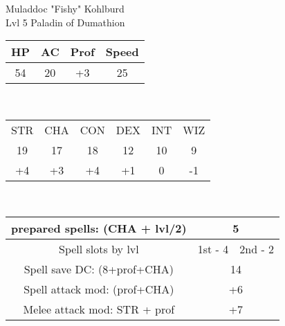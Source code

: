 \documentclass[12pt, xcolor={dvipsnames}]{beamer}
\newcommand{\str}{{\color{red}STR}}
\newcommand{\con}{{\color{red}CON}}
\newcommand{\wiz}{{\color{red}WIZ}}
\newcommand{\dex}{{\color{red}DEX}}
\newcommand{\inte}{{\color{red}INT}}
\newcommand{\cha}{{\color{red}CHA}}
\begin{document}
\begin{frame}
  \large
  \centering
  {\color{blue}Muladdoc "Fishy" Kohlburd}\\
  \normalsize{{\color{Cerulean} Lvl 5} \color{OliveGreen}Paladin of Dumathion}\\
  \vspace{1em}
  \small
  \centering
  \begin{tabular}{|c|c|c|c|}
    \textbf{HP} & \textbf{AC} & Prof & Speed\\ \hline
    54 & 20 & +3 & 25\\
  \end{tabular}\\
\vspace{1em}
  \begin{tabular}{|c|c|c|c|c|c|}
    {\str} & {\cha} & {\con} & {\dex} & {\inte} & {\wiz}\\
    19 & 17 & 18 & 12 & 10 & 9\\\hline
    +4 & +3 & +4 & +1 & 0 & -1\\
  \end{tabular}\\
  \vspace{1em}
  \begin{tabular}{|c|c|c|}
  prepared spells: ({\cha} + lvl/2) & \multicolumn{2}{|c|}{{\color{OliveGreen}5}}\\ \hline

  Spell slots by lvl & 1st - {\color{OliveGreen}4} & 2nd - {\color{OliveGreen}2}\\ \hline

  Spell save DC: (8+prof+{\cha}) & \multicolumn{2}{|c|}{{\color{OliveGreen}14}}\\ \hline

  Spell attack mod: (prof+{\cha}) & \multicolumn{2}{|c|}{{\color{OliveGreen}+6}}\\ \hline

  Melee attack mod: {\str} + prof & \multicolumn{2}{|c|}{{\color{OliveGreen} +7}}\\
\end{tabular}
\end{frame}
\end{document}
